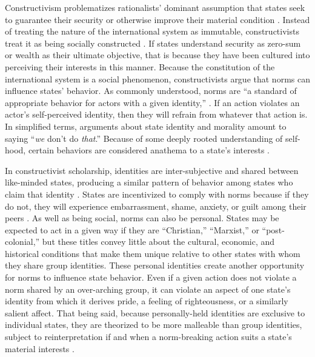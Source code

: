 \documentclass[12pt]{article}
\begin{document}
Constructivism problematizes rationalists' dominant assumption that states seek to guarantee their security or otherwise improve their material condition \citep{wendt_social_1999}. Instead of treating the nature of the international system as immutable, constructivists treat it as being socially constructed \citep{finnemore_international_1998}. If states understand security as zero-sum or wealth as their ultimate objective, that is because they have been cultured into perceiving their interests in this manner. Because the constitution of the international system is a social phenomenon, constructivists argue that norms can influence states' behavior. As commonly understood, norms are “a standard of appropriate behavior for actors with a given identity,” \citep[891]{finnemore_international_1998}. If an action violates an actor's self-perceived identity, then they will refrain from whatever that action is. In simplified terms, arguments about state identity and morality amount to saying “\textit{we} don't do \textit{that}.” Because of some deeply rooted understanding of self-hood, certain behaviors are considered anathema to a state's interests \citep{wendt_social_1999}.

In constructivist scholarship, identities are inter-subjective and shared between like-minded states, producing a similar pattern of behavior among states who claim that identity \citep{finnemore_international_1998}. States are incentivized to comply with norms because if they do not, they will experience embarrassment, shame, anxiety, or guilt among their peers \citep{fearon_what_1999}. As well as being social, norms can also be personal. States may be expected to act in a given way if they are “Christian,” “Marxist,” or “post-colonial,” but these titles convey little about the cultural, economic, and historical conditions that make them unique relative to other states with whom they share group identities. These personal identities create another opportunity for norms to influence state behavior. Even if a given action does not violate a norm shared by an over-arching group, it can violate an aspect of one state's identity from which it derives pride, a feeling of righteousness, or a similarly salient affect. That being said, because personally-held identities are exclusive to individual states, they are theorized to be more malleable than group identities, subject to reinterpretation if and when a norm-breaking action suits a state's material interests \citep{fearon_what_1999}. 
\end{document}
